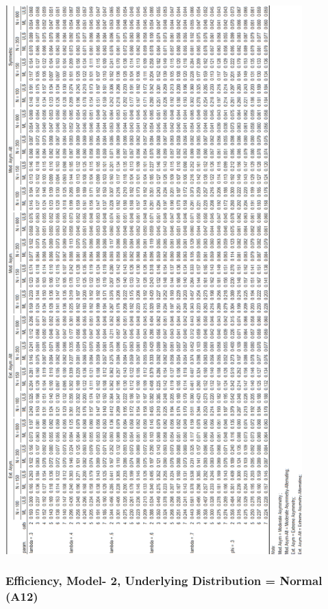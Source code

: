 \documentclass[10,a4paperpaper,]{article}
\begin{document}
\includegraphics[width=325pt]{./figures/tabA11}

\subsubsection{Efficiency, Model- 2, Underlying Distribution = Normal (A12)}
\end{document}
